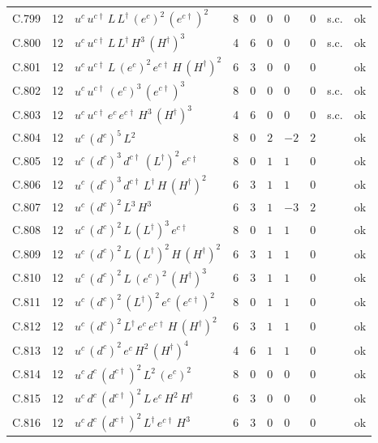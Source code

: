{\begin{longtable}{@{}ll>{\raggedright\arraybackslash}p{6.4cm}rrllllr@{}}
C.799 & 12 & $u^c\,u^{c\dagger}\,L\,L^\dagger\,(e^c)^{2}\,(e^{c\dagger})^{2}$ & 8 & 0 & $0$ & $0$ & $0$ & s.c. & ok \\
C.800 & 12 & $u^c\,u^{c\dagger}\,L\,L^\dagger\,H^{3}\,(H^\dagger)^{3}$ & 4 & 6 & $0$ & $0$ & $0$ & s.c. & ok \\
C.801 & 12 & $u^c\,u^{c\dagger}\,L\,(e^c)^{2}\,e^{c\dagger}\,H\,(H^\dagger)^{2}$ & 6 & 3 & $0$ & $0$ & $0$ &  & ok \\
C.802 & 12 & $u^c\,u^{c\dagger}\,(e^c)^{3}\,(e^{c\dagger})^{3}$ & 8 & 0 & $0$ & $0$ & $0$ & s.c. & ok \\
C.803 & 12 & $u^c\,u^{c\dagger}\,e^c\,e^{c\dagger}\,H^{3}\,(H^\dagger)^{3}$ & 4 & 6 & $0$ & $0$ & $0$ & s.c. & ok \\
C.804 & 12 & $u^c\,(d^c)^{5}\,L^{2}$ & 8 & 0 & $2$ & $-2$ & $2$ &  & ok \\
C.805 & 12 & $u^c\,(d^c)^{3}\,d^{c\dagger}\,(L^\dagger)^{2}\,e^{c\dagger}$ & 8 & 0 & $1$ & $1$ & $0$ &  & ok \\
C.806 & 12 & $u^c\,(d^c)^{3}\,d^{c\dagger}\,L^\dagger\,H\,(H^\dagger)^{2}$ & 6 & 3 & $1$ & $1$ & $0$ &  & ok \\
C.807 & 12 & $u^c\,(d^c)^{2}\,L^{3}\,H^{3}$ & 6 & 3 & $1$ & $-3$ & $2$ &  & ok \\
C.808 & 12 & $u^c\,(d^c)^{2}\,L\,(L^\dagger)^{3}\,e^{c\dagger}$ & 8 & 0 & $1$ & $1$ & $0$ &  & ok \\
C.809 & 12 & $u^c\,(d^c)^{2}\,L\,(L^\dagger)^{2}\,H\,(H^\dagger)^{2}$ & 6 & 3 & $1$ & $1$ & $0$ &  & ok \\
C.810 & 12 & $u^c\,(d^c)^{2}\,L\,(e^c)^{2}\,(H^\dagger)^{3}$ & 6 & 3 & $1$ & $1$ & $0$ &  & ok \\
C.811 & 12 & $u^c\,(d^c)^{2}\,(L^\dagger)^{2}\,e^c\,(e^{c\dagger})^{2}$ & 8 & 0 & $1$ & $1$ & $0$ &  & ok \\
C.812 & 12 & $u^c\,(d^c)^{2}\,L^\dagger\,e^c\,e^{c\dagger}\,H\,(H^\dagger)^{2}$ & 6 & 3 & $1$ & $1$ & $0$ &  & ok \\
C.813 & 12 & $u^c\,(d^c)^{2}\,e^c\,H^{2}\,(H^\dagger)^{4}$ & 4 & 6 & $1$ & $1$ & $0$ &  & ok \\
C.814 & 12 & $u^c\,d^c\,(d^{c\dagger})^{2}\,L^{2}\,(e^c)^{2}$ & 8 & 0 & $0$ & $0$ & $0$ &  & ok \\
C.815 & 12 & $u^c\,d^c\,(d^{c\dagger})^{2}\,L\,e^c\,H^{2}\,H^\dagger$ & 6 & 3 & $0$ & $0$ & $0$ &  & ok \\
C.816 & 12 & $u^c\,d^c\,(d^{c\dagger})^{2}\,L^\dagger\,e^{c\dagger}\,H^{3}$ & 6 & 3 & $0$ & $0$ & $0$ &  & ok \\

\end{longtable}}
